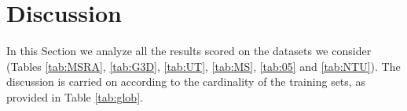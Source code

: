 \documentclass[10pt,twocolumn]{article}
\begin{document}
\begin{table*}[t!]
	\vspace{5pt}
	\caption{Comprehensive evaluation of the proposed approach, measuring the (positive or negative) improvement $\iota$ of the proposed \textit{Log-COV-Net} with respect to the best among the reported methods. For any dataset, we also provide $N$, that is the order of magnitude of the available instances.}
	\label{tab:glob}
\end{table*}

\section{Discussion}\label{sez:d}

In this Section we analyze all the results scored on the datasets we consider (Tables \ref{tab:MSRA}, 
\ref{tab:G3D}, 
\ref{tab:UT}, \ref{tab:MS}, \ref{tab:05} and \ref{tab:NTU}). The discussion is carried on according to the cardinality of the training sets, as provided in Table \ref{tab:glob}.
\end{document}
